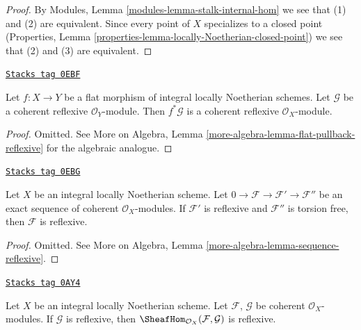 \begin{proof}
By Modules, Lemma \ref{modules-lemma-stalk-internal-hom} we see that
(1) and (2) are equivalent. Since every point of $X$ specializes to
a closed point
(Properties, Lemma \ref{properties-lemma-locally-Noetherian-closed-point})
we see that (2) and (3) are equivalent.
\end{proof}

\begin{lemma}
\label{divisors-lemma-flat-pullback-reflexive}
\href{https://stacks.math.columbia.edu/tag/0EBF}{\texttt{Stacks tag 0EBF}}

Let $f : X \to Y$ be a flat morphism of integral locally Noetherian schemes.
Let $\mathcal{G}$ be a coherent reflexive $\mathcal{O}_Y$-module.
Then $f^*\mathcal{G}$ is a coherent reflexive $\mathcal{O}_X$-module.
\end{lemma}

\begin{proof}
Omitted. See
More on Algebra, Lemma \ref{more-algebra-lemma-flat-pullback-reflexive}
for the algebraic analogue.
\end{proof}

\begin{lemma}
\label{divisors-lemma-sequence-reflexive}
\href{https://stacks.math.columbia.edu/tag/0EBG}{\texttt{Stacks tag 0EBG}}

Let $X$ be an integral locally Noetherian scheme.
Let $0 \to \mathcal{F} \to \mathcal{F}' \to \mathcal{F}''$ be
an exact sequence of coherent $\mathcal{O}_X$-modules.
If $\mathcal{F}'$ is reflexive and $\mathcal{F}''$ is torsion free,
then $\mathcal{F}$ is reflexive.
\end{lemma}

\begin{proof}
Omitted. See More on Algebra, Lemma \ref{more-algebra-lemma-sequence-reflexive}.
\end{proof}

\begin{lemma}
\label{divisors-lemma-dual-reflexive}
\href{https://stacks.math.columbia.edu/tag/0AY4}{\texttt{Stacks tag 0AY4}}

Let $X$ be an integral locally Noetherian scheme.
Let $\mathcal{F}$, $\mathcal{G}$ be
coherent $\mathcal{O}_X$-modules.
If $\mathcal{G}$ is reflexive,
then $\SheafHom_{\mathcal{O}_X}(\mathcal{F}, \mathcal{G})$ is reflexive.
\end{lemma}

